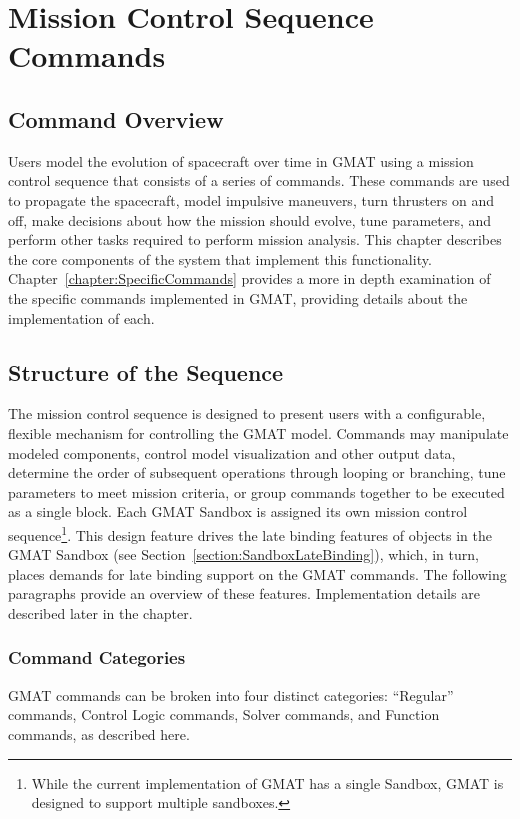 \chapter{\label{chapter:Commands}Mission Control Sequence Commands}

\section{Command Overview}

Users model the evolution of spacecraft over time in GMAT using a mission control sequence that
consists of a series of commands.  These commands are used to propagate the spacecraft, model
impulsive maneuvers, turn thrusters on and off, make decisions about how the mission should evolve,
tune parameters, and perform other tasks required to perform mission analysis.  This chapter
describes the core components of the system that implement this functionality.
Chapter~\ref{chapter:SpecificCommands} provides a more in depth examination of the specific commands
implemented in GMAT, providing details about the implementation of each.

\section{Structure of the Sequence}

The mission control sequence is designed to present users with a configurable, flexible mechanism
for controlling the GMAT model.  Commands may manipulate modeled components, control model
visualization and other output data, determine the order of subsequent operations through looping or
branching, tune parameters to meet mission criteria, or group commands together to be executed as a
single block.  Each GMAT Sandbox is assigned its own mission control sequence\footnote{While the
current implementation of GMAT has a single Sandbox, GMAT is designed to support multiple
sandboxes.}.  This design feature drives the late binding features of objects in the GMAT Sandbox
(see Section~\ref{section:SandboxLateBinding}), which, in turn, places demands for late binding
support on the GMAT commands.  The following paragraphs provide an overview of these features.
Implementation details are described later in the chapter.

\subsection{Command Categories}
GMAT commands can be broken into four distinct categories: ``Regular'' commands, Control
Logic commands, Solver commands, and Function commands, as described here.

